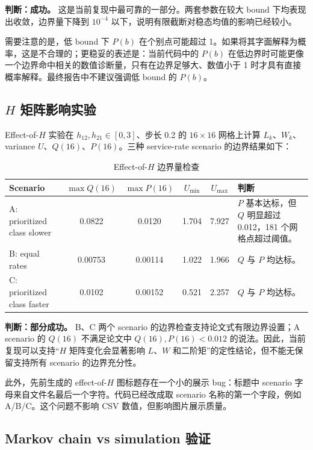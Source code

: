 \documentclass[UTF8,a4paper,11pt]{ctexart}
\newcommand{\pass}{\textcolor{green!45!black}{成功}}
\newcommand{\partialpass}{\textcolor{orange!70!black}{部分成功}}
\begin{document}
\textbf{判断：\pass。} 这是当前复现中最可靠的一部分。两套参数在较大 bound 下均表现出收敛，边界量下降到 $10^{-4}$ 以下，说明有限截断对稳态均值的影响已经较小。

需要注意的是，低 bound 下 $P(b)$ 在个别点可能超过 1。如果将其字面解释为概率，这是不合理的；更稳妥的表述是：当前代码中的 $P(b)$ 在低边界时可能更像一个边界命中相关的数值诊断量，只有在边界足够大、数值小于 1 时才具有直接概率解释。最终报告中不建议强调低 bound 的 $P(b)$。

\subsection{$H$ 矩阵影响实验}

Effect-of-$H$ 实验在 $h_{12},h_{21}\in[0,3]$、步长 0.2 的 $16\times16$ 网格上计算 $L_k$、$W_k$、variance $U$、$Q(16)$、$P(16)$。三种 service-rate scenario 的边界结果如下：

\begin{table}[H]
\centering
\caption{Effect-of-$H$ 边界量检查}
\begin{tabularx}{\textwidth}{@{}p{}ccccX@{}}
\toprule
Scenario & $\max Q(16)$ & $\max P(16)$ & $U_{\min}$ & $U_{\max}$ & 判断 \\
\midrule
A: prioritized class slower & 0.0822 & 0.0120 & 1.704 & 7.927 & $P$ 基本达标，但 $Q$ 明显超过 0.012，181 个网格点超过阈值。\\
B: equal rates & 0.00753 & 0.00114 & 1.022 & 1.966 & $Q$ 与 $P$ 均达标。\\
C: prioritized class faster & 0.0102 & 0.00152 & 0.521 & 2.257 & $Q$ 与 $P$ 均达标。\\
\bottomrule
\end{tabularx}
\end{table}

\textbf{判断：\partialpass。} B、C 两个 scenario 的边界检查支持论文式有限边界设置；A scenario 的 $Q(16)$ 不满足论文中 $Q(16),P(16)<0.012$ 的说法。因此，当前复现可以支持“$H$ 矩阵变化会显著影响 $L$、$W$ 和二阶矩”的定性结论，但不能无保留支持所有 scenario 的边界充分性。

此外，先前生成的 effect-of-$H$ 图标题存在一个小的展示 bug：标题中 scenario 字母来自文件名最后一个字符。代码已经改成取 scenario 名称的第一个字段，例如 A/B/C。这个问题不影响 CSV 数值，但影响图片展示质量。

\subsection{Markov chain vs simulation 验证}
\end{document}
